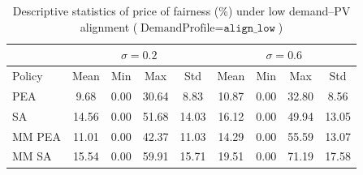 \begin{table}[h]
\centering
\caption{Descriptive statistics of price of fairness (\%) under low demand--PV alignment ($\text{DemandProfile}=\texttt{align\_low}$)}
\label{tab:price_of_fairness_demand_align_low}
\begin{tabular}{lcccccccc}
\hline
 & \multicolumn{4}{c}{$\sigma = 0.2$} & \multicolumn{4}{c}{$\sigma = 0.6$} \\
\hline
Policy & Mean & Min & Max & Std & Mean & Min & Max & Std \\
\hline
 PEA & 9.68 & 0.00 & 30.64 & 8.83 & 10.87 & 0.00 & 32.80 & 8.56 \\
 SA & 14.56 & 0.00 & 51.68 & 14.03 & 16.12 & 0.00 & 49.94 & 13.05 \\
 MM PEA & 11.01 & 0.00 & 42.37 & 11.03 & 14.29 & 0.00 & 55.59 & 13.07 \\
 MM SA & 15.54 & 0.00 & 59.91 & 15.71 & 19.51 & 0.00 & 71.19 & 17.58 \\
\hline
\end{tabular}
\end{table}
